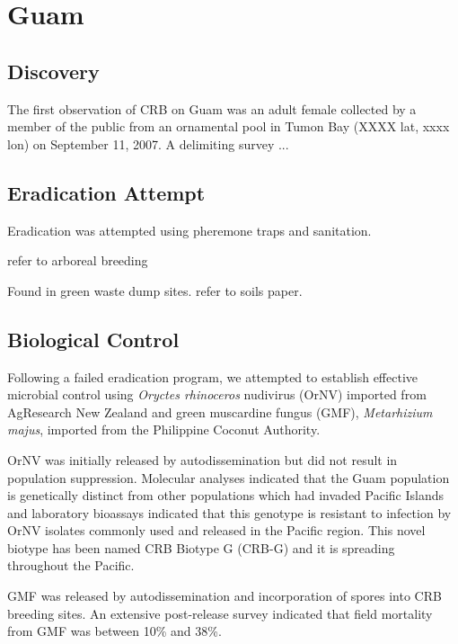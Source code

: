 \documentclass[preprint,12pt]{elsarticle}
\begin{document}
\linenumbers

\section{Guam}

\subsection{Discovery}

The first observation of CRB on Guam was an adult female collected by a member of the public from an ornamental pool in Tumon Bay (XXXX lat, xxxx lon) on September 11, 2007. A delimiting survey ...

\subsection{Eradication Attempt}

Eradication was attempted using pheremone traps and sanitation.

refer to arboreal breeding

Found in green waste dump sites. refer to soils paper.


\subsection{Biological Control}
Following a failed eradication program, we attempted to establish effective microbial control using \textit{Oryctes rhinoceros} nudivirus (OrNV) imported from AgResearch New Zealand and green muscardine fungus (GMF), \textit{Metarhizium majus}, imported from the Philippine Coconut Authority.

OrNV was initially released by autodissemination but did not result in population suppression. Molecular analyses indicated that the Guam population is genetically distinct from other populations which had invaded Pacific Islands and laboratory bioassays indicated that this genotype is resistant to infection by OrNV isolates commonly used and released in the Pacific region. This novel biotype has been named CRB Biotype G (CRB-G) and it is spreading throughout the Pacific. 

GMF was released by autodissemination and incorporation of spores into CRB breeding sites. An extensive post-release survey indicated that field mortality from GMF was between 10\% and 38\%.
\end{document}
